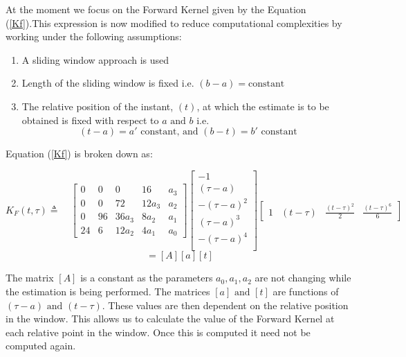 \documentclass{article}
\begin{document}
At the moment we focus on the Forward Kernel given by the Equation (\ref{Kf}).This expression is now modified to reduce computational complexities by working under the following assumptions:
\begin{enumerate}
\item A sliding window approach is used
\item Length of the sliding window is fixed i.e. $(b-a)=\textrm{constant}$
\item The relative position of the instant, $(t)$,  at which the estimate is to be obtained is fixed with respect to $a\textrm{ and }b \textrm{ i.e. }$ $$ (t-a)= a' \textrm{ constant, and } (b-t)=b'\textrm{ constant}$$  
\end{enumerate}
Equation (\ref{Kf}) is broken down as:

\begin{equation}
K_{F}(t,\tau) \triangleq \quad 
\begin{bmatrix}
0  &  0  &   0   &  16    &   a_3   \\
0  &  0  &   72   & 12a_3  &   a_2  \\
0  &  96 & 36a_3 &  8a_2  &   a_1   \\
24 &  6  & 12a_2 &  4a_1   &   a_0  
\end{bmatrix}
\begin{bmatrix}
     - 1       \\
 (\tau - a)    \\
-(\tau - a)^2  \\
 (\tau - a)^3  \\
-(\tau - a)^4  \\
\end{bmatrix}
\begin{bmatrix}
1  & (t-\tau) & \frac{(t-\tau)^2}{2} & \frac{(t-\tau)^6}{6}
\end{bmatrix}
\label{Kf_2}
\end{equation}
\begin{equation}
= [A][a][t] 
\end{equation}

The matrix $[A]$ is a constant as the parameters $a_0, a_1, a_2$ are not changing while the estimation is being performed. The matrices $[a] \textrm{ and } [t]$ are functions of $(\tau-a) \textrm{ and } (t-\tau)$. These values are then dependent on the relative position in the window. This allows us to calculate the value of the Forward Kernel at each relative point in the window. Once this is computed it need not be computed again. 
\end{document}
